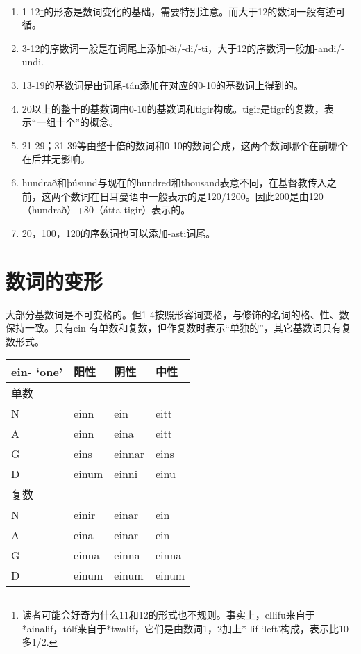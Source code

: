 {{\begin{enumerate}
  \def\labelenumi{\arabic{enumi})}
  \item
        1-12\footnote{读者可能会好奇为什么11和12的形式也不规则。事实上，ellifu来自于*ainalif，tólf来自于*twalif，它们是由数词1，2加上*-lif
          `left'构成，表示比10多1/2.}的形态是数词变化的基础，需要特别注意。而大于12的数词一般有迹可循。
  \item
        3-12的序数词一般是在词尾上添加-ði/-di/-ti，大于12的序数词一般加-andi/-undi.
  \item
        13-19的基数词是由词尾-tán添加在对应的0-10的基数词上得到的。
  \item
        20以上的整十的基数词由0-10的基数词和tigir构成。tigir是tigr的复数，表示``一组十个''的概念。
  \item
        21-29；31-39等由整十倍的数词和0-10的数词合成，这两个数词哪个在前哪个在后并无影响。
  \item
        hundrað和þúsund与现在的hundred和thousand表意不同，在基督教传入之前，这两个数词在日耳曼语中一般表示的是120/1200。因此200是由120（hundrað）+80（átta
        tigir）表示的。
  \item
        20，100，120的序数词也可以添加-asti词尾。
\end{enumerate}

\section{数词的变形}\label{数词的变形}

大部分基数词是不可变格的。但1-4按照形容词变格，与修饰的名词的格、性、数保持一致。只有ein-有单数和复数，但作复数时表示``单独的''，其它基数词只有复数形式。

\begin{longtable}{llll}
  \toprule
  ein- `one‌' & 阳性    & 阴性     & 中性    \\
  \midrule
  \endhead
  \bottomrule
  \endfoot
  单数         &       &        &       \\
  N          & einn  & ein    & eitt  \\
  A          & einn  & eina   & eitt  \\
  G          & eins  & einnar & eins  \\
  D          & einum & einni  & einu  \\
  复数         &       &        &       \\
  N          & einir & einar  & ein   \\
  A          & eina  & einar  & ein   \\
  G          & einna & einna  & einna \\
  D          & einum & einum  & einum \\
\end{longtable}

}}
